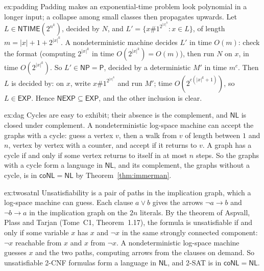 \begin{solution}{ex:padding}
\idea Padding makes an exponential-time problem look polynomial in a longer input; a collapse among small classes then propagates upwards.
\writeup Let $L\in\mathsf{NTIME}(2^{n^k})$, decided by $N$, and $L'=\{x\#1^{2^{|x|^k}}:x\in L\}$, of length $m=|x|+1+2^{|x|^k}$. A nondeterministic machine decides $L'$ in time $O(m)$: check the format (computing $2^{|x|^k}$ in time $O(2^{|x|^k})=O(m)$), then run $N$ on $x$, in time $O(2^{|x|^k})$. So $L'\in\mathsf{NP}=\mathsf P$, decided by a deterministic $M'$ in time $m^c$. Then $L$ is decided by: on $x$, write $x\#1^{2^{|x|^k}}$ and run $M'$; time $O(2^{c(|x|^k+1)})$, so $L\in\mathsf{EXP}$. Hence $\mathsf{NEXP}\subseteq\mathsf{EXP}$, and the other inclusion is clear.
\end{solution}

\begin{solution}{ex:dag}
\idea Cycles are easy to exhibit; their absence is the complement, and $\mathsf{NL}$ is closed under complement.
\writeup A nondeterministic log-space machine can accept the graphs with a cycle: guess a vertex $v$, then a walk from $v$ of length between $1$ and $n$, vertex by vertex with a counter, and accept if it returns to $v$. A graph has a cycle if and only if some vertex returns to itself in at most $n$ steps. So the graphs with a cycle form a language in $\mathsf{NL}$, and its complement, the graphs without a cycle, is in $\mathsf{coNL}=\mathsf{NL}$ by Theorem~\ref{thm:immerman}.
\end{solution}

\begin{solution}{ex:twosatnl}
\idea Unsatisfiability is a pair of paths in the implication graph, which a log-space machine can guess.
\writeup Each clause $a\lor b$ gives the arrows $\neg a\to b$ and $\neg b\to a$ in the implication graph on the $2n$ literals. By the theorem of Aspvall, Plass and Tarjan (Tome~C1, Theorem~1.17), the formula is unsatisfiable if and only if some variable $x$ has $x$ and $\neg x$ in the same strongly connected component: $\neg x$ reachable from $x$ and $x$ from $\neg x$. A nondeterministic log-space machine guesses $x$ and the two paths, computing arrows from the clauses on demand. So unsatisfiable 2-CNF formulas form a language in $\mathsf{NL}$, and 2-SAT is in $\mathsf{coNL}=\mathsf{NL}$.
\end{solution}

